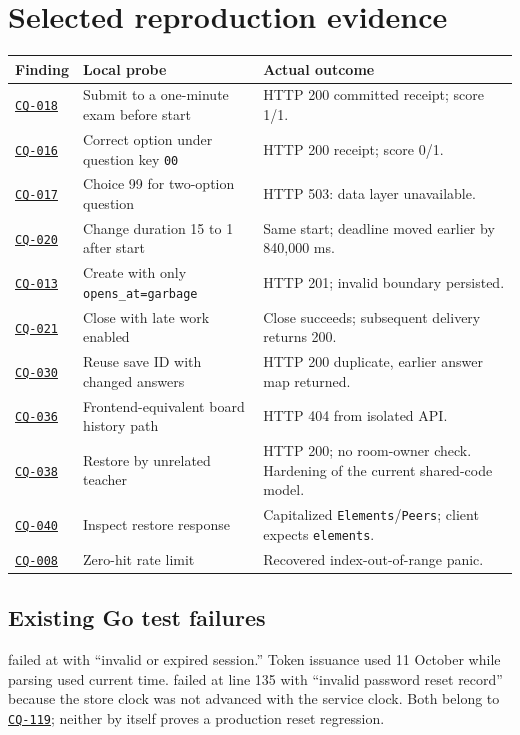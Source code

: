 \documentclass[11pt,a4paper]{article}
\DeclareRobustCommand{\issue}[1]{\hyperlink{#1}{\texttt{#1}}}
\newcommand{\src}[1]{{\small\path{#1}}}
\begin{document}
\section{Selected reproduction evidence}
\begin{tabularx}{\textwidth}{@{}P{22mm}P{51mm}X@{}}\toprule Finding & Local probe & Actual outcome \\\midrule
\issue{CQ-018} & Submit to a one-minute exam before start & HTTP 200 committed receipt; score 1/1. \\
\issue{CQ-016} & Correct option under question key \texttt{00} & HTTP 200 receipt; score 0/1. \\
\issue{CQ-017} & Choice 99 for two-option question & HTTP 503: data layer unavailable. \\
\issue{CQ-020} & Change duration 15 to 1 after start & Same start; deadline moved earlier by 840,000 ms. \\
\issue{CQ-013} & Create with only \texttt{opens\_at=garbage} & HTTP 201; invalid boundary persisted. \\
\issue{CQ-021} & Close with late work enabled & Close succeeds; subsequent delivery returns 200. \\
\issue{CQ-030} & Reuse save ID with changed answers & HTTP 200 duplicate, earlier answer map returned. \\
\issue{CQ-036} & Frontend-equivalent board history path & HTTP 404 from isolated API. \\
\issue{CQ-038} & Restore by unrelated teacher & HTTP 200; no room-owner check. Hardening of the current shared-code model. \\
\issue{CQ-040} & Inspect restore response & Capitalized \texttt{Elements}/\texttt{Peers}; client expects \texttt{elements}. \\
\issue{CQ-008} & Zero-hit rate limit & Recovered index-out-of-range panic. \\\bottomrule\end{tabularx}
\subsection{Existing Go test failures}
 failed at \src{internal/auth/qol_test.go:48} with ``invalid or expired session.'' Token issuance used 11 October while parsing used current time.  failed at line 135 with ``invalid password reset record'' because the store clock was not advanced with the service clock. Both belong to \issue{CQ-119}; neither by itself proves a production reset regression.
\end{document}
